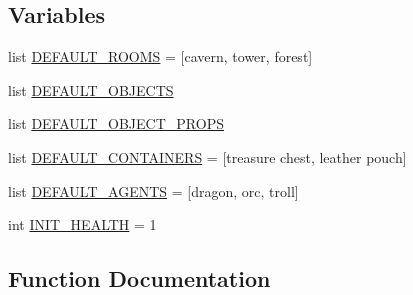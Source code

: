 \subsection*{Variables}
\begin{DoxyCompactItemize}
\item 
list \hyperlink{namespaceprojects_1_1mastering__the__dungeon_1_1tasks_1_1graph__world2_1_1graph_a46660bf7524ab0daf978091dab907fe2}{D\+E\+F\+A\+U\+L\+T\+\_\+\+R\+O\+O\+MS} = \mbox{[}\textquotesingle{}cavern\textquotesingle{}, \textquotesingle{}tower\textquotesingle{}, \textquotesingle{}forest\textquotesingle{}\mbox{]}
\item 
list \hyperlink{namespaceprojects_1_1mastering__the__dungeon_1_1tasks_1_1graph__world2_1_1graph_a5adca69a99c88e39290df4e46afda30f}{D\+E\+F\+A\+U\+L\+T\+\_\+\+O\+B\+J\+E\+C\+TS}
\item 
list \hyperlink{namespaceprojects_1_1mastering__the__dungeon_1_1tasks_1_1graph__world2_1_1graph_ab72eee91380271a1dc9005068a2260ef}{D\+E\+F\+A\+U\+L\+T\+\_\+\+O\+B\+J\+E\+C\+T\+\_\+\+P\+R\+O\+PS}
\item 
list \hyperlink{namespaceprojects_1_1mastering__the__dungeon_1_1tasks_1_1graph__world2_1_1graph_a966131e32fddc243b6bad83775e821bd}{D\+E\+F\+A\+U\+L\+T\+\_\+\+C\+O\+N\+T\+A\+I\+N\+E\+RS} = \mbox{[}\textquotesingle{}treasure chest\textquotesingle{}, \textquotesingle{}leather pouch\textquotesingle{}\mbox{]}
\item 
list \hyperlink{namespaceprojects_1_1mastering__the__dungeon_1_1tasks_1_1graph__world2_1_1graph_a51752d98142bb1bc6dceb087f8d57063}{D\+E\+F\+A\+U\+L\+T\+\_\+\+A\+G\+E\+N\+TS} = \mbox{[}\textquotesingle{}dragon\textquotesingle{}, \textquotesingle{}orc\textquotesingle{}, \textquotesingle{}troll\textquotesingle{}\mbox{]}
\item 
int \hyperlink{namespaceprojects_1_1mastering__the__dungeon_1_1tasks_1_1graph__world2_1_1graph_a3d24d6ff6f2d61e3e6d902abd9413dde}{I\+N\+I\+T\+\_\+\+H\+E\+A\+L\+TH} = 1
\end{DoxyCompactItemize}


\subsection{Function Documentation}
\mbox{\label{namespaceprojects_1_1mastering__the__dungeon_1_1tasks_1_1graph__world2_1_1graph_a5cd70dc74f0447a0dda626d8c524b4c9}} 
